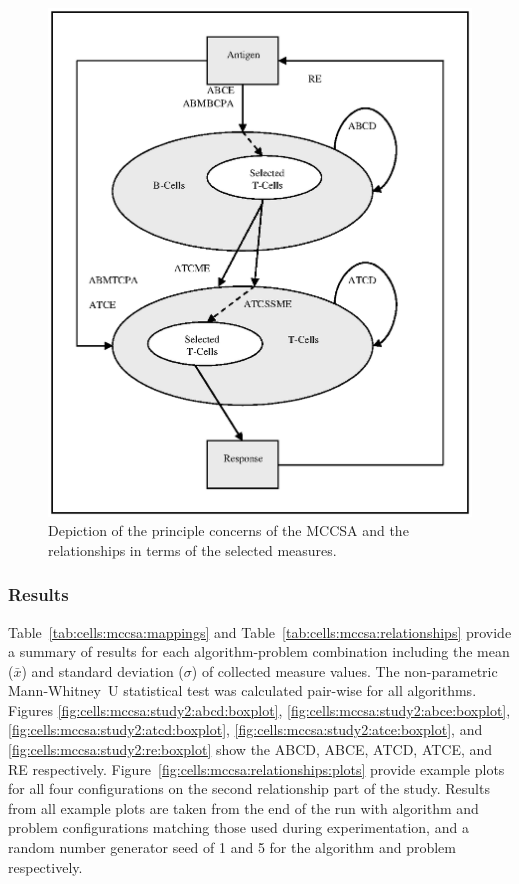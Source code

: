 \begin{figure}[htp]
	\centering
		\includegraphics[scale=0.75]{Cells/MCCSA-measures}
	\caption{Depiction of the principle concerns of the MCCSA and the relationships in terms of the selected measures.}
	\label{fig:mccsa:measures}	
\end{figure}


%
%
\subsubsection{Results}
Table~\ref{tab:cells:mccsa:mappings} and Table~\ref{tab:cells:mccsa:relationships} provide a summary of results for each algorithm-problem combination including the mean ($\bar{x}$) and standard deviation ($\sigma$) of collected measure values. The non-parametric Mann-Whitney~U statistical test was calculated pair-wise for all algorithms. 
Figures \ref{fig:cells:mccsa:study2:abcd:boxplot}, \ref{fig:cells:mccsa:study2:abce:boxplot}, \ref{fig:cells:mccsa:study2:atcd:boxplot}, \ref{fig:cells:mccsa:study2:atce:boxplot}, and \ref{fig:cells:mccsa:study2:re:boxplot} show the ABCD, ABCE, ATCD, ATCE, and RE respectively. Figure~\ref{fig:cells:mccsa:relationships:plots} provide example plots for all four configurations on the second relationship part of the study. 
Results from all example plots are taken from the end of the run with algorithm and problem configurations matching those used during experimentation, and a random number generator seed of 1 and 5 for the algorithm and problem respectively.

